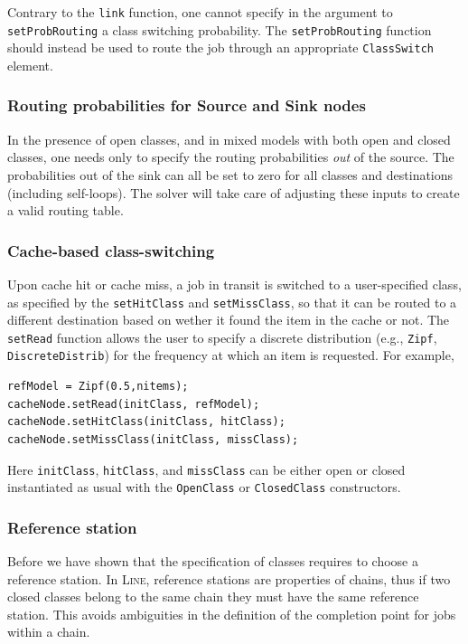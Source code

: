 Contrary to the \texttt{link} function, one cannot specify in the argument to \texttt{setProbRouting} a class switching probability. The \texttt{setProbRouting} function should instead be used to route the job through an appropriate \texttt{ClassSwitch} element.

\subsubsection{Routing probabilities for Source and Sink nodes}
In the presence of open classes, and in mixed models with both open and closed classes, one needs only to specify the routing probabilities {\em out} of the source. The probabilities out of the sink can all be set to zero for all classes and destinations (including self-loops). The solver will take care of adjusting these inputs to create a valid routing table.

\subsubsection{Cache-based class-switching}
\label{cache-based-class-switching}
Upon cache hit or cache miss, a job in transit is switched to a user-specified class, as specified by the \texttt{setHitClass} and \texttt{setMissClass}, so that it can be routed to a different destination based on wether it found the item in the cache or not. The \texttt{setRead} function allows the user to specify a discrete distribution (e.g., \texttt{Zipf}, \texttt{DiscreteDistrib}) for the frequency at which an item is requested. For example,
\begin{lstlisting}
refModel = Zipf(0.5,nitems);
cacheNode.setRead(initClass, refModel);
cacheNode.setHitClass(initClass, hitClass);
cacheNode.setMissClass(initClass, missClass);
\end{lstlisting}
Here \texttt{initClass}, \texttt{hitClass}, and \texttt{missClass} can be either open or closed instantiated as usual with the \texttt{OpenClass} or \texttt{ClosedClass} constructors.

\subsubsection{Reference station}
\label{reference-station}
Before we have shown that the specification of classes requires to choose a reference station. In \textsc{Line}, reference stations are properties of chains, thus if two closed classes belong to the same chain they must have the same reference station. This avoids ambiguities in the definition of the completion point for jobs within a chain.


